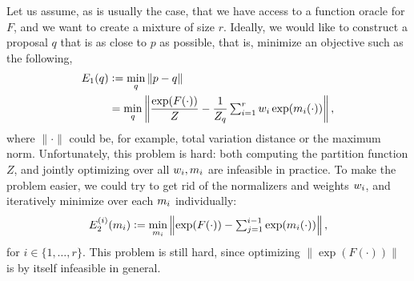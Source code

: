 Let us assume, as is usually the case, that we have access to a function oracle for $F$, and we want to create a mixture of size $r$.
Ideally, we would like to construct a proposal $q$ that is as close to $p$ as possible, that is, minimize an objective such as the following,
\begin{align*}
  E_1(q) &\vcentcolon= \min_q \| p - q \|\\
         &= \min_q \left\| \frac{\exp(F(\cdot))}{Z} - \frac{1}{Z_q}\textstyle\sum_{i = 1}^r w_i\exp(m_i(\cdot)) \right\|,
\end{align*}
where $\| \cdot \|$ could be, for example, total variation distance or the maximum norm.
Unfortunately, this problem is hard: both computing the partition function $Z$, and jointly optimizing over all $w_i, m_i$ are infeasible in practice.
To make the problem easier, we could try to get rid of the normalizers and weights $w_i$, and iteratively minimize over each $m_i$ individually:
\begin{align*}
  E_2^{(i)}(m_i) \vcentcolon= \min_{m_i} \left\| \exp(F(\cdot)) - \textstyle\sum_{j = 1}^{i-1} \exp(m_i(\cdot)) \right\|,
\end{align*}
for $i \in \{1, \ldots, r\}$.
This problem is still hard, since optimizing $\| \exp(F(\cdot)) \|$ is by itself infeasible in general.



